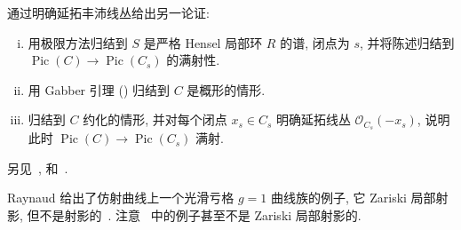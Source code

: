 \begin{exercise}\label{src:6.4.2}
通过明确延拓丰沛线丛给出另一论证:
\begin{enumerate}[(i)]
\item 用极限方法归结到 $S$ 是严格 Hensel 局部环 $R$ 的谱, 闭点为 $s$, 并将陈述归结到 $\operatorname{Pic}(C)\to\operatorname{Pic}(C_s)$ 的满射性.
\item 用 Gabber 引理 () 归结到 $C$ 是概形的情形.
\item 归结到 $C$ 约化的情形, 并对每个闭点 $x_s\in C_s$ 明确延拓线丛 $\mathcal O_{C_s}(-x_s)$, 说明此时 $\operatorname{Pic}(C)\to\operatorname{Pic}(C_s)$ 满射.
\end{enumerate}
另见~\cite[IV.4.1]{SGA4half}, \cite[引理 1.2]{Hal13} 和~\cite[推论 13.2.5]{Ols16}.
\end{exercise}
\begin{remark}\label{src:6.4.3}
Raynaud 给出了仿射曲线上一个光滑亏格 $g=1$ 曲线族的例子, 它 Zariski 局部射影, 但不是射影的~\cite[XIII.3.1]{Ray70}. 注意~ 中的例子甚至不是 Zariski 局部射影的.
\end{remark}
